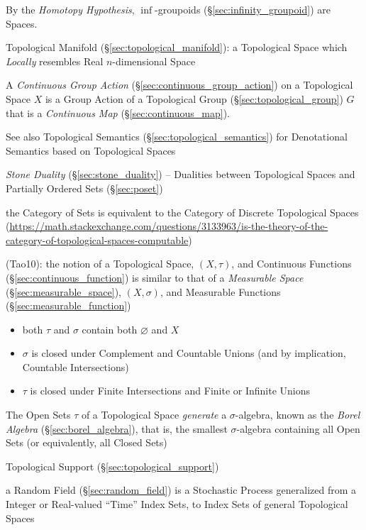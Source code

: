 By the \emph{Homotopy Hypothesis}, $\inf$-groupoids
(\S\ref{sec:infinity_groupoid}) are Spaces.

\fist Topological Manifold (\S\ref{sec:topological_manifold}): a Topological
Space which \emph{Locally} resembles Real $n$-dimensional Space

A \emph{Continuous Group Action} (\S\ref{sec:continuous_group_action}) on a
Topological Space $X$ is a Group Action of a Topological Group
(\S\ref{sec:topological_group}) $G$ that is a \emph{Continuous Map}
(\S\ref{sec:continuous_map}).

\fist See also Topological Semantics
(\S\ref{sec:topological_semantics}) for Denotational Semantics based
on Topological Spaces

\emph{Stone Duality} (\S\ref{sec:stone_duality}) -- Dualities between
Topological Spaces and Partially Ordered Sets (\S\ref{sec:poset})

the Category of Sets is equivalent to the Category of Discrete Topological
Spaces
(\url{https://math.stackexchange.com/questions/3133963/is-the-theory-of-the-category-of-topological-spaces-computable})

(Tao10):
the notion of a Topological Space, $(X,\tau)$, and Continuous Functions
(\S\ref{sec:continuous_function}) is similar to that of a \emph{Measurable
  Space} (\S\ref{sec:measurable_space}), $(X,\sigma)$, and Measurable Functions
(\S\ref{sec:measurable_function})
\begin{itemize}
  \item both $\tau$ and $\sigma$ contain both $\varnothing$ and $X$
  \item $\sigma$ is closed under Complement and Countable Unions (and
    by implication, Countable Intersections)
  \item $\tau$ is closed under Finite Intersections and Finite or Infinite
    Unions
\end{itemize}
The Open Sets $\tau$ of a Topological Space \emph{generate} a $\sigma$-algebra,
known as the \emph{Borel Algebra} (\S\ref{sec:borel_algebra}), that is, the
smallest $\sigma$-algebra containing all Open Sets (or equivalently, all Closed
Sets)

\fist Topological Support (\S\ref{sec:topological_support})

\fist a Random Field (\S\ref{sec:random_field}) is a Stochastic Process
generalized from a Integer or Real-valued ``Time'' Index Sets, to Index Sets of
general Topological Spaces

\asterism

